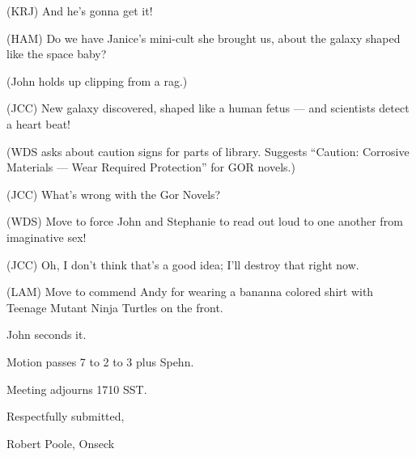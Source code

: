 (KRJ) And he's gonna get it!

(HAM) Do we have Janice's mini-cult she brought us, about the galaxy shaped
like the space baby?

(John holds up clipping from a rag.)

(JCC) New galaxy discovered, shaped like a human fetus --- and scientists
detect a heart beat!

(WDS asks about caution signs for parts of library.  Suggests ``Caution:
Corrosive Materials --- Wear Required Protection'' for GOR novels.)

(JCC) What's wrong with the Gor Novels?

(WDS) Move to force John and Stephanie to read out loud to one another from
imaginative sex!

(JCC) Oh, I don't think that's a good idea; I'll destroy that right now.

(LAM) Move to commend Andy for wearing a bananna colored shirt with Teenage
Mutant Ninja Turtles on the front.

John seconds it.

Motion passes 7 to 2 to 3 plus Spehn.

Meeting adjourns 1710 SST.

\vspace{0.15in}
\begin{center}
Respectfully submitted,

Robert Poole, Onseck
\end{center}

